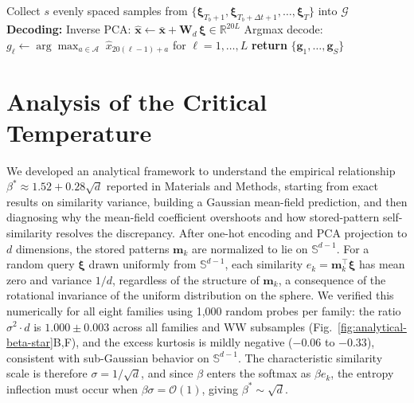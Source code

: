 \begin{algorithm}[ht]
\begin{algorithmic}[1]
    \ENDFOR
    \STATE Collect $s$ evenly spaced samples from $\{\boldsymbol{\xi}_{T_b+1}, \boldsymbol{\xi}_{T_b+\Delta t+1}, \ldots, \boldsymbol{\xi}_T\}$ into $\mathcal{G}$
\ENDFOR
\STATE \textbf{Decoding:}
    \STATE Inverse PCA: $\hat{\mathbf{x}} \leftarrow \bar{\mathbf{x}} + \mathbf{W}_d\,\boldsymbol{\xi} \in \mathbb{R}^{20L}$
    \STATE Argmax decode: $g_\ell \leftarrow \arg\max_{a \in \mathcal{A}}\; \hat{x}_{20(\ell-1)+a}$ \; for $\ell = 1,\ldots,L$
\ENDFOR
\STATE \textbf{return} $\{\mathbf{g}_1, \ldots, \mathbf{g}_S\}$
\end{algorithmic}
\end{algorithm}

\section{Analysis of the Critical Temperature}\label{si:beta-star-theory}

We developed an analytical framework to understand the empirical relationship $\beta^* \approx 1.52 + 0.28\sqrt{d}$ reported in Materials and Methods, starting from exact results on similarity variance, building a Gaussian mean-field prediction, and then diagnosing why the mean-field coefficient overshoots and how stored-pattern self-similarity resolves the discrepancy. After one-hot encoding and PCA projection to $d$ dimensions, the stored patterns $\mathbf{m}_k$ are normalized to lie on $\mathbb{S}^{d-1}$. For a random query $\boldsymbol{\xi}$ drawn uniformly from $\mathbb{S}^{d-1}$, each similarity $e_k = \mathbf{m}_k^\top\boldsymbol{\xi}$ has mean zero and variance $1/d$, regardless of the structure of $\mathbf{m}_k$, a consequence of the rotational invariance of the uniform distribution on the sphere. We verified this numerically for all eight families using 1{,}000 random probes per family: the ratio $\sigma^2 \cdot d$ is $1.000 \pm 0.003$ across all families and WW subsamples (Fig.~\ref{fig:analytical-beta-star}B,F), and the excess kurtosis is mildly negative ($-0.06$ to $-0.33$), consistent with sub-Gaussian behavior on $\mathbb{S}^{d-1}$. The characteristic similarity scale is therefore $\sigma = 1/\sqrt{d}$, and since $\beta$ enters the softmax as $\beta e_k$, the entropy inflection must occur when $\beta\sigma = \mathcal{O}(1)$, giving $\beta^* \sim \sqrt{d}$.

